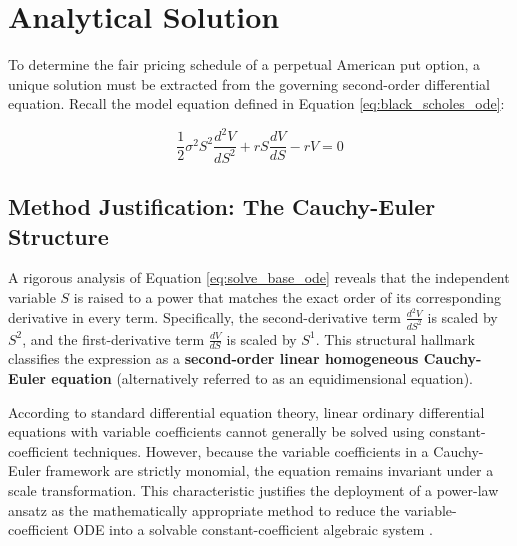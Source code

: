 \documentclass[12pt]{article}
\theoremstyle{definition}
\numberwithin{equation}{section}
\begin{document}
\vfill\pagebreak


\section{Analytical Solution}

To determine the fair pricing schedule of a perpetual American put option, a unique solution must be extracted from the governing second-order differential equation. Recall the model equation defined in Equation \eqref{eq:black_scholes_ode}:

\begin{equation}\label{eq:solve_base_ode}
\frac{1}{2}\sigma^2 S^2 \frac{d^2 V}{dS^2} + rS \frac{dV}{dS} - rV = 0
\end{equation}

\subsection{Method Justification: The Cauchy-Euler Structure}
A rigorous analysis of Equation \eqref{eq:solve_base_ode} reveals that the independent variable 
$S$ is raised to a power that matches the exact order of its corresponding derivative 
in every term. Specifically, the second-derivative term $\frac{d^2 V}{dS^2}$ is scaled by $S^2$, 
and the first-derivative term $\frac{dV}{dS}$ is scaled by $S^1$. This structural hallmark 
classifies the expression as a \textbf{second-order linear homogeneous Cauchy-Euler equation} 
(alternatively referred to as an equidimensional equation). 

According to standard differential equation theory, linear ordinary differential equations with 
variable coefficients cannot generally be solved using constant-coefficient techniques. However, 
because the variable coefficients in a Cauchy-Euler framework are strictly monomial, the equation 
remains invariant under a scale transformation. This characteristic justifies the deployment of a 
power-law ansatz as the mathematically appropriate method to reduce the variable-coefficient ODE 
into a solvable constant-coefficient algebraic system \cite{Oksendal2005}.
\end{document}
